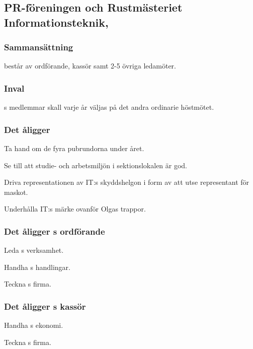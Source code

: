 \subsection{PR-föreningen och Rustmästeriet Informationsteknik, \PRIT}
\subsubsection{Sammansättning}
\PRIT{} består av ordförande, kassör samt 2-5 övriga ledamöter.

\subsubsection{Inval}
\PRIT{}s medlemmar skall varje år väljas på det andra ordinarie höstmötet.

\subsubsection{Det åligger \PRIT}
\begin{att}
	\item Ta hand om de fyra pubrundorna under året.
	\item Se till att studie- och arbetsmiljön i sektionslokalen är god.
	\item Driva representationen av IT:s skyddshelgon i form av att utse representant för maskot.
	\item Underhålla IT:s märke ovanför Olgas trappor.
\end{att}

\subsubsection{Det åligger \PRIT{}s ordförande}
\begin{att}
	\item Leda \PRIT{}s verksamhet.
	\item Handha \PRIT{}s handlingar.
	\item Teckna \PRIT{}s firma.
\end{att}

\subsubsection{Det åligger \PRIT{}s kassör}
\begin{att}
	\item Handha \PRIT{}s ekonomi.
	\item Teckna \PRIT{}s firma.
\end{att}